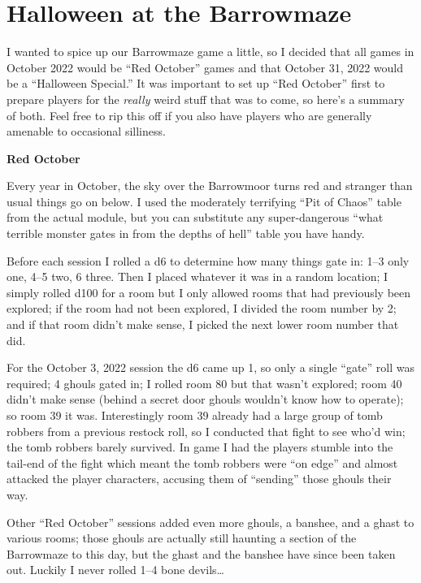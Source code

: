 
\section{Halloween at the Barrowmaze}

I wanted to spice up our Barrowmaze game a little, so I decided that all games
in October 2022 would be ``Red October'' games and that October 31, 2022 would
be a ``Halloween Special.'' It was important to set up ``Red October'' first to
prepare players for the \emph{really} weird stuff that was to come, so here's a
summary of both. Feel free to rip this off if you also have players who are
generally amenable to occasional silliness.

\textbf{Red October}

Every year in October, the sky over the Barrowmoor turns red and stranger than
usual things go on below. I used the moderately terrifying ``Pit of Chaos''
table from the actual module, but you can substitute any super-dangerous ``what
terrible monster gates in from the depths of hell'' table you have handy.

Before each session I rolled a d6 to determine how many things gate in: 1--3 only
one, 4--5 two, 6 three. Then I placed whatever it was in a random location; I
simply rolled d100 for a room but I only allowed rooms that had previously been
explored; if the room had not been explored, I divided the room number by 2; and
if that room didn't make sense, I picked the next lower room number that did.

For the October 3, 2022 session the d6 came up 1, so only a single ``gate'' roll
was required; 4 ghouls gated in; I rolled room 80 but that wasn't explored; room
40 didn't make sense (behind a secret door ghouls wouldn't know how to operate);
so room 39 it was.
%
Interestingly room 39 already had a large group of tomb robbers from a previous
restock roll, so I conducted that fight to see who'd win; the tomb robbers barely
survived. In game I had the players stumble into the tail-end of the fight which
meant the tomb robbers were ``on edge'' and almost attacked the player
characters, accusing them of ``sending'' those ghouls their way.

Other ``Red October'' sessions added even more ghouls, a banshee, and a ghast
to various rooms; those ghouls are actually still haunting a section of the
Barrowmaze to this day, but the ghast and the banshee have since been taken out.
Luckily I never rolled 1--4 bone devils\dots{}

